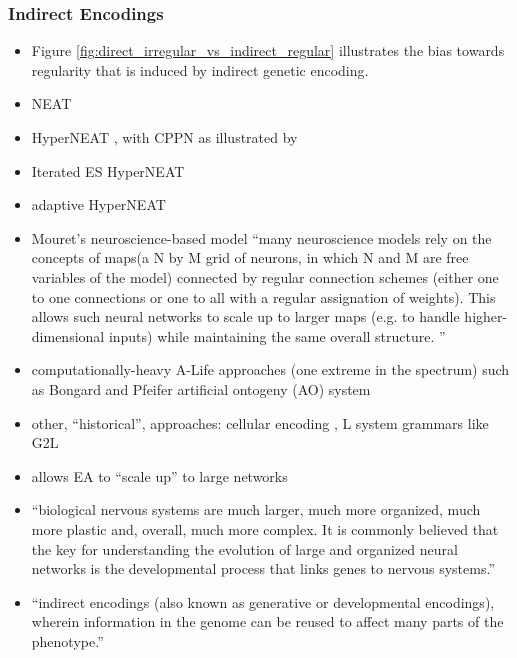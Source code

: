 \subsubsection{Indirect Encodings} \label{sec:indirect_encodings}
  \begin{itemize}
    \item Figure \ref{fig:direct_irregular_vs_indirect_regular} illustrates the bias towards regularity that is induced by indirect genetic encoding.
  	\item NEAT \cite[p 324]{Downing2015IntelligenceSystems}
    \item HyperNEAT \cite[p 339]{Downing2015IntelligenceSystems}, with CPPN as illustrated by 
    \item Iterated ES HyperNEAT \cite{Risi2011EnhancingNetworks}
    \item adaptive HyperNEAT \cite{Risi2010IndirectlyRules}
    \item Mouret's neuroscience-based model ``many neuroscience models rely on the concepts of maps(a N by M grid of neurons, in which N and M are free variables of the model) connected by regular connection schemes (either one to one connections or one to all with a regular assignation of  weights). This allows such neural  networks to scale up to larger maps (e.g. to handle higher-dimensional inputs) while maintaining the same overall structure. '' \cite{Mouret2010ImportingGanglia} 
    \item computationally-heavy A-Life approaches (one extreme in the spectrum) such as Bongard and Pfeifer artificial ontogeny (AO) system \cite[p 345]{Downing2015IntelligenceSystems}
    \item other, ``historical'', approaches: cellular encoding \cite[p 334]{Downing2015IntelligenceSystems}, L system grammars like G2L \cite[p 335]{Downing2015IntelligenceSystems}
    \item allows EA to ``scale up'' to large networks
    \item  ``biological nervous systems are much larger, much more organized, much more plastic and, overall, much more complex. It is commonly believed that the key for understanding the evolution of  large and organized neural networks is the developmental process that links genes to nervous systems.'' \cite{Tonelli2013OnNetworks}
    \item ``indirect encodings (also known as generative or developmental encodings), wherein information in the genome can be reused to affect many parts of the phenotype.'' \cite{Clune2011OnRegularity}

\end{itemize}
